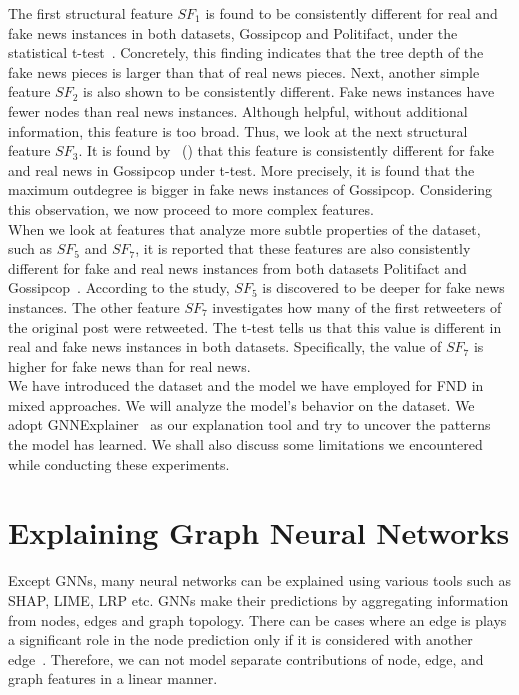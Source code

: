 The first structural feature $SF_1$ is found to be consistently different for real and fake news instances in both datasets, Gossipcop and Politifact, under the statistical t-test~\parencite{HierarchicalPropagationNetworksForFND_Shu}. Concretely, this finding indicates that the tree depth of the fake news pieces is larger than that of real news pieces. Next, another simple feature $SF_2$ is also shown to be consistently different. Fake news instances have fewer nodes than real news instances. Although helpful, without additional information, this feature is too broad. Thus, we look at the next structural feature $SF_3$. It is found by~\citeauthor{HierarchicalPropagationNetworksForFND_Shu} (\citeyear{HierarchicalPropagationNetworksForFND_Shu}) that this feature is consistently different for fake and real news in Gossipcop under t-test. More precisely, it is found that the maximum outdegree is bigger in fake news instances of Gossipcop. Considering this observation, we now proceed to more complex features.\\
When we look at features that analyze more subtle properties of the dataset, such as $SF_5$ and $SF_7$, it is reported that these features are also consistently different for fake and real news instances from both datasets Politifact and Gossipcop~\parencite{HierarchicalPropagationNetworksForFND_Shu}. According to the study, $SF_5$ is discovered to be deeper for fake news instances. The other feature $SF_7$ investigates how many of the first retweeters of the original post were retweeted. The t-test tells us that this value is different in real and fake news instances in both datasets. Specifically, the value of $SF_7$ is higher for fake news than for real news.\\
We have introduced the dataset and the model we have employed for FND in mixed approaches. We will analyze the model's behavior on the dataset. We adopt GNNExplainer~\parencite{GNNExplainer_Ying} as our explanation tool and try to uncover the patterns the model has learned. We shall also discuss some limitations we encountered while conducting these experiments.

\section{Explaining Graph Neural Networks}
\label{sec:ExplainingGNNs}
Except GNNs, many neural networks can be explained using various tools such as SHAP, LIME, LRP etc. GNNs
make their predictions by aggregating information from nodes, edges and graph topology. There can be cases where an edge
is plays a significant role in the node prediction only if it is considered with another edge~\parencite{CNNsOnGraphsForLearningMolecularFingerprints_Duvenaud}. Therefore, we can not model separate contributions of node,
edge, and graph features in a linear manner.\\

